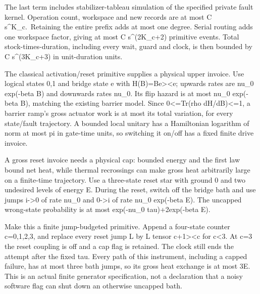 \documentclass[
]{article}
\begin{document}
The last term includes stabilizer-tableau simulation of the specified
private fault kernel. Operation count, workspace and new records are at
most C
s\allowbreak{}\^{}\allowbreak{}K\allowbreak{}\_\allowbreak{}c\allowbreak{}.\allowbreak{} \allowbreak{}R\allowbreak{}e\allowbreak{}t\allowbreak{}a\allowbreak{}i\allowbreak{}n\allowbreak{}i\allowbreak{}n\allowbreak{}g
the entire prefix adds at most one degree. Serial routing adds one
workspace factor, giving at most C s\^{}(2K\_c+2) primitive events.
Total stock-times-duration, including every wait, guard and clock, is
then bounded by C s\^{}(3K\_c+3) in unit-duration units.

The classical
a\allowbreak{}c\allowbreak{}t\allowbreak{}i\allowbreak{}v\allowbreak{}a\allowbreak{}t\allowbreak{}i\allowbreak{}o\allowbreak{}n\allowbreak{}/\allowbreak{}r\allowbreak{}e\allowbreak{}s\allowbreak{}e\allowbreak{}t
primitive supplies a physical upper invoice. Use logical states 0,1 and
bridge state e with H(B)=B\textbar e\textgreater\textless e\textbar;
upwards rates are nu\_0 exp(-beta B) and downwards rates nu\_0. Its flip
hazard is at most nu\_0 exp(-beta B), matching the existing barrier
model. Since 0\textless=Tr(rho dH/dB)\textless=1, a barrier ramp's gross
actuator work is at most its total variation, for every state/fault
trajectory. A bounded local unitary has a Hamiltonian logarithm of norm
at most pi in gate-time units, so switching it on/off has a fixed finite
drive invoice.

A gross reset invoice needs a physical cap: bounded energy and the first
law bound net heat, while thermal recrossings can make gross heat
arbitrarily large on a finite-time trajectory. Use a three-state reset
star with ground 0 and two undesired levels of energy E. During the
reset, switch off the bridge bath and use jumps i-\textgreater0 of rate
nu\_0 and 0-\textgreater i of rate nu\_0 exp(-beta E). The uncapped
wrong-state probability is at most exp(-nu\_0 tau)+2exp(-beta E).

Make this a finite jump-budgeted primitive. Append a four-state counter
c=0,1,2,3, and replace every reset jump L by L tensor
\textbar c+1\textgreater\textless c\textbar{} for c\textless3. At c=3
the reset coupling is off and a cap flag is retained. The clock still
ends the attempt after the fixed tau. Every path of this instrument,
including a capped failure, has at most three bath jumps, so its gross
heat exchange is at most 3E. This is an actual finite generator
specification, not a declaration that a noisy software flag can shut
down an otherwise uncapped bath.
\end{document}
